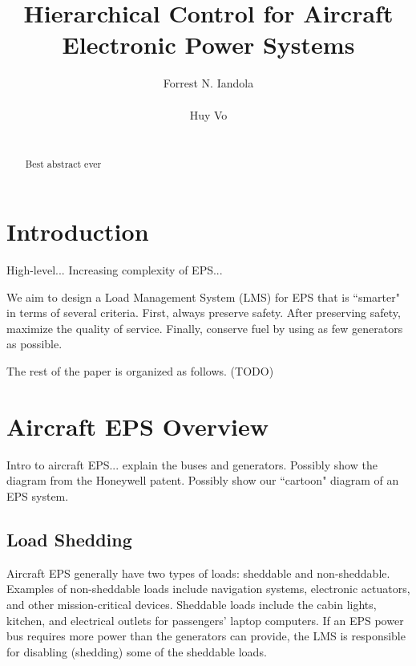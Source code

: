 \documentclass{acm_proc_article-sp}
\begin{document}
\title{Hierarchical Control for Aircraft Electronic Power Systems}

\author{
\alignauthor
Forrest N. Iandola\\
       \\
\alignauthor
Huy Vo\\
       \\
}

\maketitle
\begin{abstract}
Best abstract ever
\end{abstract}


\section{Introduction}
High-level... Increasing complexity of EPS...

We aim to design a Load Management System (LMS) for EPS that is ``smarter" in terms of several criteria.
First, always preserve safety.
After preserving safety, maximize the quality of service.
Finally, conserve fuel by using as few generators as possible.

The rest of the paper is organized as follows. (TODO)

\section{Aircraft EPS Overview}
Intro to aircraft EPS... explain the buses and generators.
Possibly show the diagram from the Honeywell patent.
Possibly show our ``cartoon" diagram of an EPS system.

\subsection{Load Shedding}
Aircraft EPS generally have two types of loads: sheddable and non-sheddable.
Examples of non-sheddable loads include navigation systems, electronic actuators, and other mission-critical devices.
Sheddable loads include the cabin lights, kitchen, and electrical outlets for passengers' laptop computers.
If an EPS power bus requires more power than the generators can provide, the LMS is responsible for disabling (shedding) some of the sheddable loads.
\end{document}
